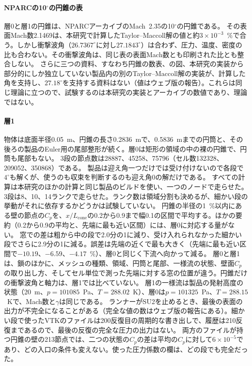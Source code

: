 \documentclass[twocolumn]{labreport}
\newcommand{\Cp}{C_p}
\begin{document}
\paragraph{NPARCの10$^\circ$の円錐の表}
\label{sec:cone10}
層0と層1の円錐は、NPARCアーカイブのMach~2.35の10$^\circ$の円錐\citep{nparc_cone10}である。
その表面Mach数2.1469は、本研究で計算したTaylor--Maccoll解の値と約$3\times10^{-3}$~\%で合う。しかし衝撃波角（$26.7367^\circ$に対し$27.1843^\circ$）は合わず、圧力、温度、密度の比も合わない。その衝撃波角は、同じ表の表面Mach数とも印刷された比とも整合しない。
さらに三つの資料、すなわち円錐の数表\citep{sims1964}、\citet{ames1953}の図、本研究の実装から部分的にしか独立していない製品内の別のTaylor--Maccoll解の実装が、計算した角を支持し、$27.18^\circ$を支持する資料はない（値はウェブ版の報告）。これらは同じ理論に立つので、試験するのは本研究の実装とアーカイブの数値であり、理論ではない。

\paragraph{層1}
物体は底面半径0.05~m、円錐の長さ0.2836~mで、0.5836~mまでの円筒と、その後ろの製品のEuler用の尾部整形が続く。層0は矩形の領域の中の裸の円錐で、円筒も尾部もない。
3段の節点数は28887、45258、75796（セル数132328、209052、350868）である。
製品は迎え角一つだけでは受け付けないので各段で$4^\circ$も解くが、使うのも収束を判断するのも迎え角0の解だけである。
すべての計算は本研究のほかの計算と同じ製品のビルドを使い、一つのノードで走らせた。
3段は8、10、14ランクで走らせた。ランク数は領域分割も決めるが、細かい段の挙動がそれに依存するかどうかは試験していない。
円錐の半径の1~\%以内にある壁の節点の$\Cp$を、$x/L_\mathrm{cone}$の0.2から0.9まで幅0.1の区間で平均する。ほかの要約（0.2から0.9の平均と、先端に最も近い区間）には、層0に対応する量がない。
窓での差は粗から中の段で2.0分の1に減り、受け入れられなかった細かい段でさらに2.9分の1に減る。誤差は先端の近くで最も大きく（先端に最も近い区間で$-10.19$、$-6.59$、$-4.17$~\%）、層0と同じく下流へ向かって減る。
層0と層1は、鎖のほかに、メッシュの種類、領域、円筒と尾部、一様流の状態、壁面$\Cp$の取り出し方、そしてセル単位で測った先端に対する窓の位置が違う。円錐だけの衝撃波角と軸力は、層1では比べていない。
層1の一様流は製品の発射高度の状態（20~m、$p=101085$~Pa、$T=288.02$~K）、層0は$p=101325$~Pa、$T=288.15$~Kで、Mach数と$\gamma$は同じである。
ランナーがSU2を止めるとき、最後の表面の出力が不完全になることがある（完全な値の数はウェブ版の報告にある）。細かい段で使ったVTKのファイルは200反復目の周期的な書き出しで、履歴は210反復まであるので、最後の反復の完全な圧力の出力はない。
両方のファイルが持つ円錐の壁の213節点では、二つの状態の$\Cp$の差は平均の$\Cp$に対して$6\times10^{-5}$であり、どの入口の条件も変えない。使った圧力係数の欄は、どの段でも完全だった。
\end{document}
